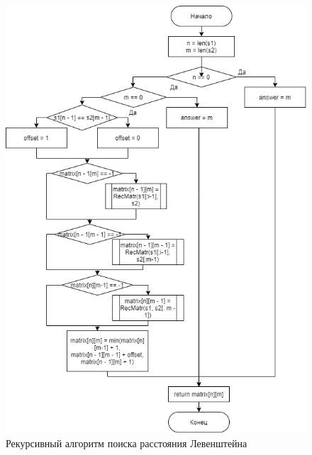 \documentclass{article}
\begin{document}
	 	\begin{figure}
	 		\includegraphics[scale=0.7]{LevenshtainRecursiveMatrix}
		 	\caption{Рекурсивный алгоритм поиска расстояния Левенштейна}
		 	\label{LevenshtainRecursiveMatrix}
	 	\end{figure}
\end{document}
